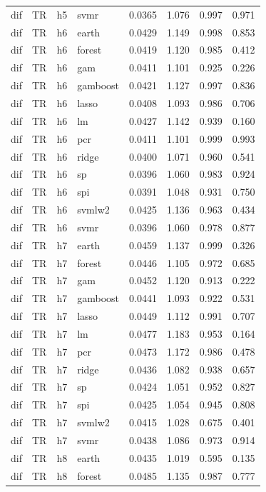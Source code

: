 \begin{ThreePartTable}
\begin{longtable}[t]{llclcccc}
dif & TR & h5 & svmr & 0.0365 & 1.076 & 0.997 & 0.971\\
\addlinespace
dif & TR & h6 & earth & 0.0429 & 1.149 & 0.998 & 0.853\\
dif & TR & h6 & forest & 0.0419 & 1.120 & 0.985 & 0.412\\
dif & TR & h6 & gam & 0.0411 & 1.101 & 0.925 & 0.226\\
dif & TR & h6 & gamboost & 0.0421 & 1.127 & 0.997 & 0.836\\
dif & TR & h6 & lasso & 0.0408 & 1.093 & 0.986 & 0.706\\
dif & TR & h6 & lm & 0.0427 & 1.142 & 0.939 & 0.160\\
dif & TR & h6 & pcr & 0.0411 & 1.101 & 0.999 & 0.993\\
dif & TR & h6 & ridge & 0.0400 & 1.071 & 0.960 & 0.541\\
dif & TR & h6 & sp & 0.0396 & 1.060 & 0.983 & 0.924\\
dif & TR & h6 & spi & 0.0391 & 1.048 & 0.931 & 0.750\\
dif & TR & h6 & svmlw2 & 0.0425 & 1.136 & 0.963 & 0.434\\
dif & TR & h6 & svmr & 0.0396 & 1.060 & 0.978 & 0.877\\
\addlinespace
dif & TR & h7 & earth & 0.0459 & 1.137 & 0.999 & 0.326\\
dif & TR & h7 & forest & 0.0446 & 1.105 & 0.972 & 0.685\\
dif & TR & h7 & gam & 0.0452 & 1.120 & 0.913 & 0.222\\
dif & TR & h7 & gamboost & 0.0441 & 1.093 & 0.922 & 0.531\\
dif & TR & h7 & lasso & 0.0449 & 1.112 & 0.991 & 0.707\\
dif & TR & h7 & lm & 0.0477 & 1.183 & 0.953 & 0.164\\
dif & TR & h7 & pcr & 0.0473 & 1.172 & 0.986 & 0.478\\
dif & TR & h7 & ridge & 0.0436 & 1.082 & 0.938 & 0.657\\
dif & TR & h7 & sp & 0.0424 & 1.051 & 0.952 & 0.827\\
dif & TR & h7 & spi & 0.0425 & 1.054 & 0.945 & 0.808\\
dif & TR & h7 & svmlw2 & 0.0415 & 1.028 & 0.675 & 0.401\\
dif & TR & h7 & svmr & 0.0438 & 1.086 & 0.973 & 0.914\\
\addlinespace
dif & TR & h8 & earth & 0.0435 & 1.019 & 0.595 & 0.135\\
dif & TR & h8 & forest & 0.0485 & 1.135 & 0.987 & 0.777\\

\end{longtable}
\end{ThreePartTable}
